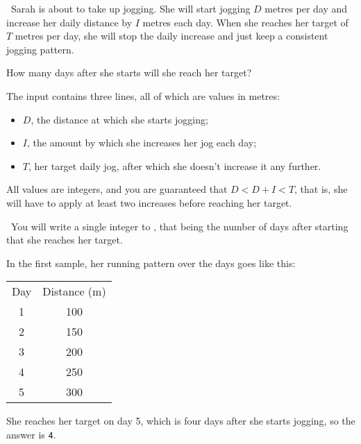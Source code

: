 

\Question\ Sarah is about to take up jogging. She will start jogging $D$ metres per day
and increase her daily distance by $I$ metres each day. When she reaches her target of $T$
metres per day, she will stop the daily increase and just keep a consistent jogging
pattern.

How many days after she starts will she reach her target?

\Input

The input contains three lines, all of which are values in metres:
\begin{itemize}
  \item $D$, the distance at which she starts jogging;
  \item $I$, the amount by which she increases her jog each day;
  \item $T$, her target daily jog, after which she doesn't increase it any further.
\end{itemize}

All values are integers, and you are guaranteed that $D < D+I < T$, that is, she will have
to apply at least two increases before reaching her target.

\Output\ You will write a single integer to \OUT, that being the number of days after
starting that she reaches her target.

\Sample



\Explanation In the first sample, her running pattern over the days goes like this:
\begin{center}
  \begin{tabular}{cc}
    Day & Distance (m) \\
    1   & 100\\
    2   & 150\\
    3   & 200\\
    4   & 250\\
    5   & 300
  \end{tabular}
\end{center}

She reaches her target on day 5, which is four days after she starts jogging, so the
answer is \texttt{4}.


